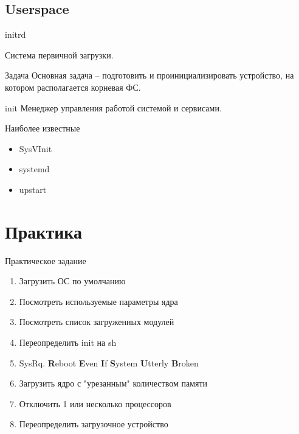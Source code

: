 \documentclass[ignorenonframetext, professionalfonts, hyperref={pdftex, unicode}]{beamer}
\begin{document}
\subsection{Userspace}

\begin{frame}{initrd}

	Система первичной загрузки.

	\begin{block}{Задача}
		Основная задача -- подготовить и проинициализировать
		устройство, на котором располагается корневая ФС.
	\end{block}
\end{frame}

\begin{frame}{init}
	Менеджер управления работой системой и сервисами.
	
	\bigskip


	\bigskip

	\begin{block}{Наиболее известные}
		\begin{itemize}
			\item SysVInit
			\item systemd
			\item upstart
		\end{itemize}
	\end{block}
\end{frame}

\section{Практика}

\begin{frame}{Практическое задание}
	\begin{enumerate}
		\item Загрузить ОС по умолчанию
		\item Посмотреть используемые параметры ядра 
		\item Посмотреть список загруженных модулей
			\pause
		\item Переопределить init на sh
		\item SysRq. {\bf R}eboot {\bf E}ven {\bf I}f {\bf S}ystem {\bf U}tterly {\bf B}roken
			\pause
		\item Загрузить ядро с "урезанным" количеством памяти
		\item Отключить 1 или несколько процессоров
			\pause
		\item Переопределить загрузочное устройство
	\end{enumerate}
\end{frame}
\end{document}
